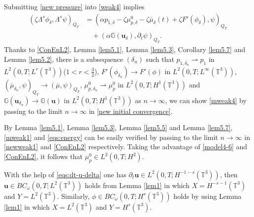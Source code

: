 \documentclass[reqno,a4paper,11pt]{amsart}
\theoremstyle{plain}
\numberwithin{equation}{section}
\begin{document}
							
							
							Submitting \eqref{new pressure} into
							\eqref{weak4} implies
							\begin{align}
								(\zeta\Lambda^{s}\phi_{\delta},\Lambda^{s}\psi)_{Q_{T}}&=(\alpha p_{1,\delta}-\zeta\mu_{p,\delta}^{0}-\zeta\overline{\mu}_{\delta}(t)+\zeta F'(\phi_{\delta}),\psi)_{Q_{T}}
								\nonumber\\&\quad+(\alpha\mathbb{G}(\mathbf{u}_{\delta}),\partial_{t}\psi)_{Q_{T}}.\label{new initial convergence}
							\end{align}
							Thanks  to \eqref{ConEnL2}, Lemma \ref{lem5.1}, Lemma \ref{lem5.3}, Corollary \ref{lem5.7} and Lemma \ref{lem5.2}, there is a subsequence $(\delta_n)$ such that $p_{1,\delta_n}\rightharpoonup p_{1}$ in $L^{2}(0,T;L^{r}(\mathbb{T}^{3}))$($1<r<\frac{3}{2}$),  $F'(\phi_{\delta_n})\rightarrow F'(\phi)$  in $L^{2}(0,T;L^{\infty}(\mathbb{T}^{3}))$, $(\overline{\mu}_{\delta_n},\psi)_{Q_{T}}\rightarrow(\overline{\mu},\psi)_{Q_{T}}$, $\mu_{p,\delta_n}^{0}\rightharpoonup \mu_{p}^{0}$ in $L^{2}(0,T;H^{1}(\mathbb{T}^{3}))$ and $\mathbb{G}(\mathbf{u}_{\delta_n})\rightarrow\mathbb{G}(\mathbf{u})$ in $L^{2}(0,T;H^{1}(\mathbb{T}^{3}))$ as $n\rightarrow \infty$,
							we can show \eqref{mweak4} by passing to the limit $n\rightarrow \infty$  in \eqref{new initial convergence}.
							
							By Lemma \ref{lem5.1}, Lemma \ref{lem5.3}, Lemma \ref{lem5.5} and Lemma \ref{lem5.7}, \eqref{mweak1} and \eqref{eqs:energy} can be  easily verified by passing to the limit $n\rightarrow \infty$  in \eqref{newweak1} and \eqref{ConEnL2} respectively. Taking the advantage of \eqref{model4-6} 
							and \eqref{ConEnL2}, it follows that $\mu_{p}^{0}\in L^{2}(0,T;H^{2})$. 
							
							With the help of \eqref{eqs:dt-u-delta} one has $\partial_{t}\mathbf{u}\in L^{2}(0,T;H^{-1-s}(\mathbb{T}^{3}))$, then $\mathbf{u}\in BC_{\omega}(0,T; L^{2}(\mathbb{T}^{3}))$ holds  from Lemma \ref{lem1} in which $X=H^{-s-1}(\mathbb{T}^{3})$ and $Y=L^2(\mathbb{T}^{3})$. Similarly, $\phi\in BC_{\omega}(0,T; H^{s}(\mathbb{T}^{3}))$ holds  by using Lemma \ref{lem1} in which $X=L^2(\mathbb{T}^{3})$ and $Y=H^s(\mathbb{T}^{3})$.
							
\end{document}
